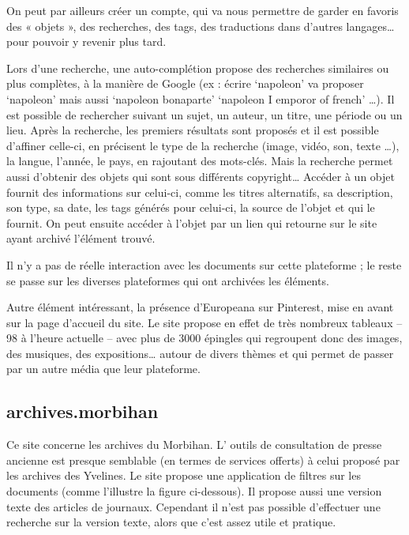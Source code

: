         On peut par ailleurs créer un compte, qui va nous permettre de garder en favoris des « objets », des recherches, des tags,
        des traductions dans d’autres langages… pour pouvoir y revenir plus tard.

        Lors d’une recherche, une auto-complétion propose des recherches similaires ou plus complètes, à la manière de Google
        (ex : écrire ‘napoleon’ va proposer ‘napoleon’ mais aussi ‘napoleon bonaparte’ ‘napoleon I emporor of french’ …).
        Il est possible de rechercher suivant un sujet, un auteur, un titre, une période ou un lieu. Après la recherche,
        les premiers résultats sont proposés et il est possible d’affiner celle-ci, en précisent le type de la recherche
        (image, vidéo, son, texte …), la langue, l'année, le pays, en rajoutant des mots-clés. Mais la recherche permet aussi
        d’obtenir des objets qui sont sous différents copyright… 
        Accéder à un objet fournit des informations sur celui-ci, comme les titres alternatifs, sa description, son type, sa date, les tags générés pour celui-ci,
        la source de l’objet et qui le fournit. On peut ensuite accéder à l’objet par un lien qui retourne sur le site ayant archivé l’élément trouvé.

        Il n’y a pas de réelle interaction avec les documents sur cette plateforme ; le reste se passe sur les diverses plateformes qui ont archivées les éléments.

        Autre élément intéressant, la présence d’Europeana sur Pinterest, mise en avant sur la page d’accueil du site.
        Le site propose en effet de très nombreux tableaux – 98 à l’heure actuelle – avec plus de 3000 épingles qui regroupent
        donc des images, des musiques, des expositions… autour de divers thèmes et qui permet de passer par un autre média que leur plateforme.


        \subsection{archives.morbihan}
        \label{subsec:morbihan}
        Ce site concerne les archives du Morbihan. L’ outils de consultation de presse ancienne est presque semblable
        (en termes de services offerts) à celui proposé par les archives des Yvelines. Le site propose une application
        de filtres sur les documents (comme l’illustre la figure ci-dessous). Il propose aussi une version texte des
        articles de journaux. Cependant il n’est pas possible d’effectuer une recherche sur la version texte,
        alors que c'est assez utile et pratique.

